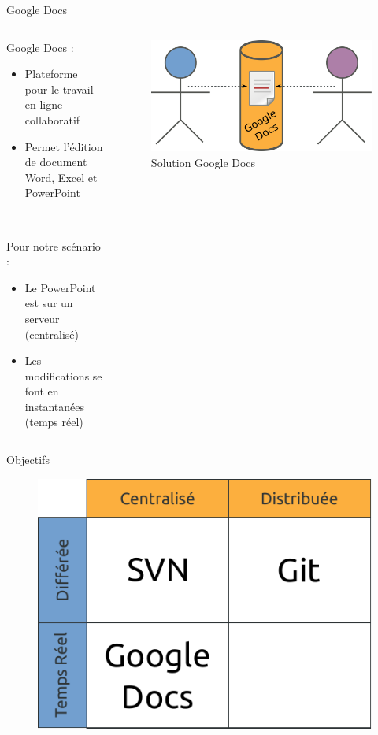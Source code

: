 \begin{frame}{Google Docs}
\begin{columns}
  \begin{column}{.5\textwidth}
  Google Docs :
  \begin{itemize}
    \item Plateforme pour le travail en ligne collaboratif
    \item Permet l'édition de document Word, Excel et PowerPoint
  \end{itemize}~

  Pour notre scénario :
  \begin{itemize}
    \item Le PowerPoint est sur un serveur (centralisé)
    \item Les modifications se font en instantanées (temps réel)
  \end{itemize}
  \end{column}

  \begin{column}{.45\textwidth}
  \begin{figure}
    \center
    \includegraphics[width=.9\textwidth]{includes/gdocs.pdf}
    \caption{Solution Google Docs}
  \end{figure}
  \end{column}
\end{columns}
\end{frame}

\begin{frame}{Objectifs}
  \begin{figure}
    \center
    \includegraphics[width=.7\textwidth]{includes/tab1.pdf}
  \end{figure}
\end{frame}

